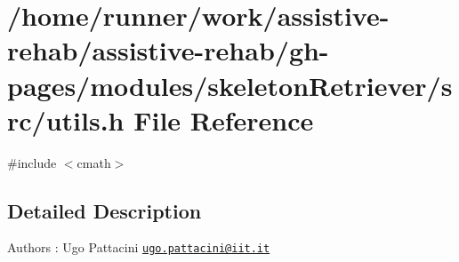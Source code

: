 \section{/home/runner/work/assistive-\/rehab/assistive-\/rehab/gh-\/pages/modules/skeleton\+Retriever/src/utils.h File Reference}
\label{utils_8h}
{\ttfamily \#include $<$cmath$>$}\newline


\subsection{Detailed Description}
\begin{DoxyAuthor}{Authors}
\+: Ugo Pattacini \href{mailto:ugo.pattacini@iit.it}{\tt ugo.\+pattacini@iit.\+it} 
\end{DoxyAuthor}
